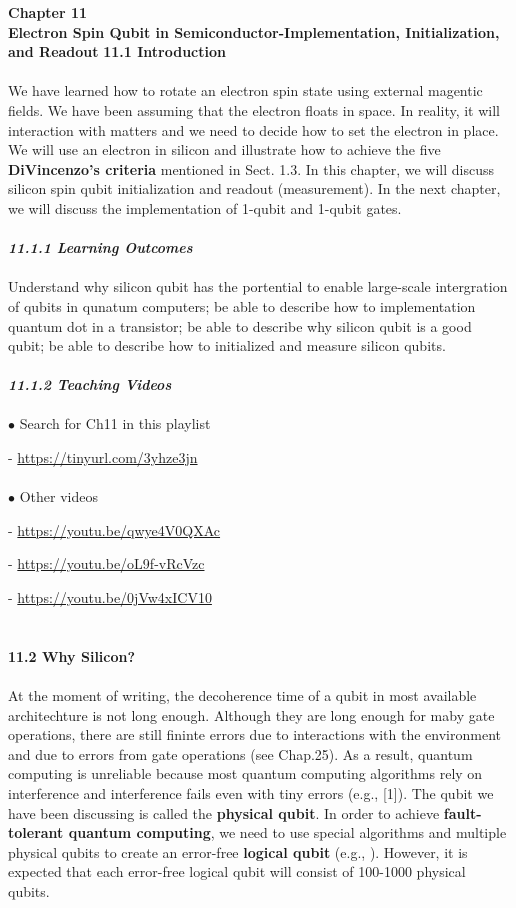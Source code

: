 \documentclass{article}
\newcommand{\bfit}[1]{\textit{\textbf{#1}}}
\begin{document}
\textbf{\Large Chapter 11\\
Electron Spin Qubit in Semiconductor-Implementation, Initialization, and Readout}
\medskip
\textbf{\large 11.1 Introduction}\\\\ 
We have learned how to rotate an electron spin state using external magentic fields.
We have been assuming that the electron floats in space. In reality, it will interaction
with matters and we need to decide how to set the electron in place. We will use an electron
in silicon and illustrate how to achieve the five \textbf{DiVincenzo's criteria}
mentioned in Sect. 1.3. In this chapter, we will discuss silicon spin qubit
initialization and readout (measurement). In the next chapter, we will discuss the
implementation of 1-qubit and 1-qubit gates.\\\\
\bfit{\large 11.1.1 Learning Outcomes}\\\\
Understand why silicon qubit has the portential to enable large-scale intergration of qubits
in qunatum computers; be able to describe how to implementation quantum dot in 
a transistor; be able to describe why silicon qubit is a good qubit; be able to describe
how to initialized and measure silicon qubits.\\\\
\bfit{\large 11.1.2 Teaching Videos}\\\\
$\bullet$ Search for Ch11 in this playlist

- \url{https://tinyurl.com/3yhze3jn}\\\\
$\bullet$ Other videos

- \url{https://youtu.be/qwye4V0QXAc}

- \url{https://youtu.be/oL9f-vRcVzc}

- \url{https://youtu.be/0jVw4xICV10}\\\\\\
\textbf{\large 11.2 Why Silicon?}\\\\
At the moment of writing, the decoherence time of a qubit in most available
architechture is not long enough. Although they are long enough for maby gate
operations, there are still fininte errors due to interactions with the environment and
due to errors from gate operations (see Chap.25). As a result, quantum computing
is unreliable because most quantum computing algorithms rely on interference
and  interference fails even with tiny errors (e.g., [1]\cite{1zaman2023step}). The qubit we have been
discussing is called the \textbf{physical qubit}. In order to achieve \textbf{fault-tolerant quantum
computing}, we need to use special algorithms and multiple physical qubits to create
an error-free \textbf{logical qubit} (e.g., \cite{2google2023suppressing}). However, it is expected that each error-free
logical qubit will consist of 100-1000 physical qubits.
\end{document}
